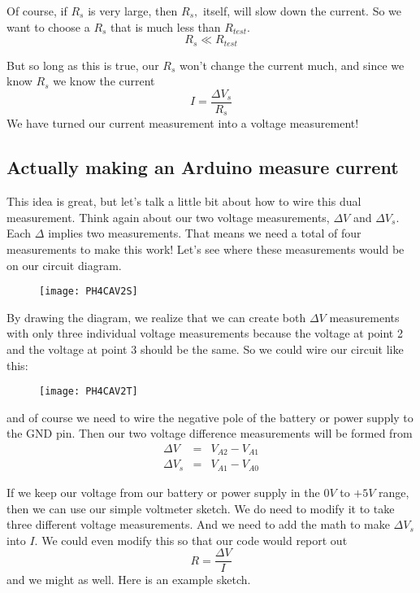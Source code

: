 Of course, if $R_{s}$ is very large, then $R_{s},$ itself, will slow down
the current. So we want to choose a $R_{s}$ that is much less than $%
R_{test}. $%
\begin{equation*}
R_{s}\ll R_{test}
\end{equation*}

But so long as this is true, our $R_{s}$ won't change the current much, and
since we know $R_{s}$ we know the current 
\begin{equation*}
I=\frac{\Delta V_{s}}{R_{s}}
\end{equation*}%
We have turned our current measurement into a voltage measurement!

\subsection{Actually making an Arduino measure current}

This idea is great, but let's talk a little bit about how to wire this dual
measurement. Think again about our two voltage measurements, $\Delta V$ and $%
\Delta V_{s}.$ Each $\Delta $ implies two measurements. That means we need a
total of four measurements to make this work! Let's see where these
measurements would be on our circuit diagram.

\begin{figure}[h!]
\texttt{[image: PH4CAV2S]}
\end{figure}By drawing the diagram, we
realize that we can create both $\Delta V$ measurements with only three
individual voltage measurements because the voltage at point 2 and the
voltage at point 3 should be the same. So we could wire our circuit like
this:\begin{figure}[h!]
\texttt{[image: PH4CAV2T]}
\end{figure}and of course we need to wire the
negative pole of the battery or power supply to the GND pin. Then our two
voltage difference measurements will be formed from 
\begin{eqnarray*}
\Delta V &=&V_{A2}-V_{A1} \\
\Delta V_{s} &=&V_{A1}-V_{A0}
\end{eqnarray*}

If we keep our voltage from our battery or power supply in the $0\unit{V}$
to $+5\unit{V}$ range, then we can use our simple voltmeter sketch. We do
need to modify it to take three different voltage measurements. And we need
to add the math to make $\Delta V_{s}$ into $I.$ We could even modify this
so that our code would report out 
\begin{equation*}
R=\frac{\Delta V}{I}
\end{equation*}%
and we might as well. Here is an example sketch.

